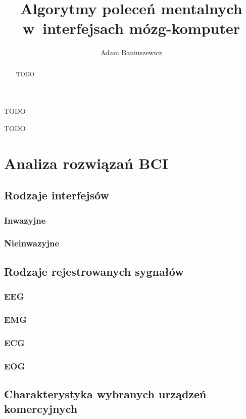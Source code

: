 \documentclass[skorowidz,skroty]{dyplomWEZUT}
\author{Adam Baniuszewicz}
\title{Algorytmy poleceń mentalnych w~interfejsach mózg-komputer}
\begin{document}
\begin{streszczenie}
TODO
\end{streszczenie}

\begin{abstract}
TODO
\end{abstract}

\maketitle

\begin{wprowadzenie}

TODO

\end{wprowadzenie}



\chapter{Analiza rozwiązań BCI}
\section{Rodzaje interfejsów}
\subsection{Inwazyjne}
\subsection{Nieinwazyjne}
\section{Rodzaje rejestrowanych sygnałów}
\subsection{EEG}
\subsection{EMG}
\subsection{ECG}
\subsection{EOG}
\section{Charakterystyka wybranych urządzeń komercyjnych}
\end{document}
